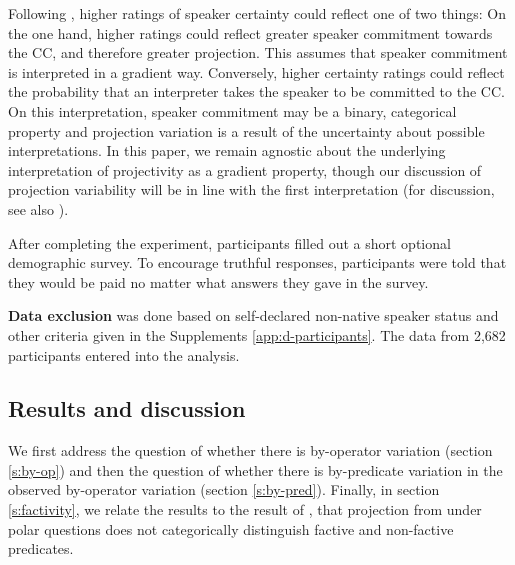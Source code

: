 \documentclass[a4paper,12pt,twoside]{article}
\begin{document}
            Following \citet{tonhauser_how_2018}, higher ratings of speaker certainty could reflect one of two things: On the one hand, higher ratings could reflect greater speaker commitment towards the CC, and therefore greater projection. This assumes that speaker commitment is interpreted in a gradient way.
            Conversely, higher certainty ratings could reflect the probability that an interpreter takes the speaker to be committed to the CC.  On this interpretation, speaker commitment may be a binary, categorical property and projection variation is a result of the uncertainty about possible interpretations. In this paper, we remain agnostic about the underlying interpretation of projectivity as a gradient property, though our discussion of projection variability will be in line with the first interpretation (for discussion, see also \citealt{grove_factivity_2023}).
            
            After completing the experiment, participants filled out a short optional demographic survey. To encourage truthful responses, participants were told that they would be paid no matter what answers they gave in the survey.

        \noindent\textbf{Data exclusion}
            was done based on self-declared non-native speaker status and other criteria given in the Supplements \ref{app:d-participants}. The data from 2,682 participants entered into the analysis.

    \subsection{Results and discussion}

        We first address the question of whether there is by-operator variation (section \ref{s:by-op}) and then the question of whether there is by-predicate variation in the observed by-operator variation (section \ref{s:by-pred}). Finally, in section \ref{s:factivity}, we relate the results to the result of \citealt{degen_are_2022}, that projection from under polar questions does not categorically distinguish factive and non-factive predicates.
    
\end{document}
